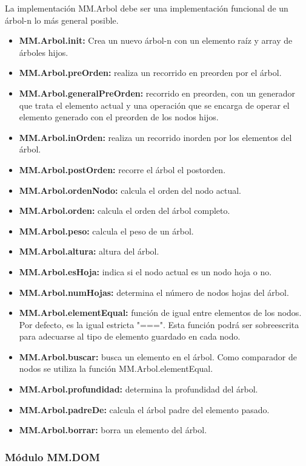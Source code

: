 La implementación MM.Arbol debe ser una implementación funcional de un árbol-n lo más general posible. 

\begin{itemize}
\item \textbf{MM.Arbol.init:} Crea un nuevo árbol-n con un elemento raíz y array de árboles hijos.
\item \textbf{MM.Arbol.preOrden:} realiza un recorrido en preorden por el árbol.
\item \textbf{MM.Arbol.generalPreOrden:} recorrido en preorden, con un generador que trata el elemento actual y una operación que se encarga de operar el elemento generado con el preorden de los nodos hijos.
\item \textbf{MM.Arbol.inOrden:} realiza un recorrido inorden por los elementos del árbol.
\item \textbf{MM.Arbol.postOrden:} recorre el árbol el postorden.
\item \textbf{MM.Arbol.ordenNodo:} calcula el orden del nodo actual.
\item \textbf{MM.Arbol.orden:} calcula el orden del árbol completo.
\item \textbf{MM.Arbol.peso:} calcula el peso de un árbol.
\item \textbf{MM.Arbol.altura:} altura del árbol.
\item \textbf{MM.Arbol.esHoja:} indica si el nodo actual es un nodo hoja o no.
\item \textbf{MM.Arbol.numHojas:} determina el número de nodos hojas del árbol.
\item \textbf{MM.Arbol.elementEqual:} función de igual entre elementos de los nodos. Por defecto, es la igual estricta "===". Esta función podrá ser sobreescrita para adecuarse al tipo de elemento guardado en cada nodo.
\item \textbf{MM.Arbol.buscar:} busca un elemento en el árbol. Como comparador de nodos se utiliza la función MM.Arbol.elementEqual.
\item \textbf{MM.Arbol.profundidad:} determina la profundidad del árbol.
\item \textbf{MM.Arbol.padreDe:} calcula el árbol padre del elemento pasado.
\item \textbf{MM.Arbol.borrar:} borra un elemento del árbol.
\end{itemize}



\subsubsection{Módulo MM.DOM}


